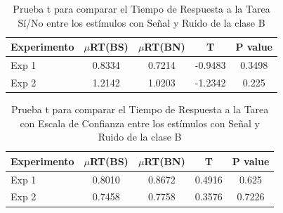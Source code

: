 \begin{table}
\caption[Tiempo de Respuesta a la tarea Sí/No para la clase A (Señal vs Ruido)]{Prueba t para comparar el Tiempo de Respuesta a la Tarea Sí/No entre los estímulos con Señal y Ruido de la clase B}
\label{Tabla_RT1_B}
\centering
\begin{tabular}{l |  c c c c}
\toprule
\textbf{Experimento} & \textbf{$\mu$RT(BS)} & \textbf{$\mu$RT(BN)} & \textbf{T} & \textbf{P value}\\
\midrule
Exp 1 & 0.8334 & 0.7214 & -0.9483 & 0.3498 \\
Exp 2 & 1.2142 & 1.0203 & -1.2342 & 0.225  \\
\bottomrule
\end{tabular}
\end{table}

\begin{table}
\caption[Tiempo de Respuesta a la tarea Sí/No para la clase A (Señal vs Ruido)]{Prueba t para comparar el Tiempo de Respuesta a la Tarea con Escala de Confianza entre los estímulos con Señal y Ruido de la clase B}
\label{Tabla_RT2_B}
\centering
\begin{tabular}{l |  c c c c}
\toprule
\textbf{Experimento} & \textbf{$\mu$RT(BS)} & \textbf{$\mu$RT(BN)} & \textbf{T} & \textbf{P value}\\
\midrule
Exp 1 & 0.8010 & 0.8672 & 0.4916 & 0.625 \\
Exp 2 & 0.7458 & 0.7758 & 0.3576 & 0.7226  \\
\bottomrule
\end{tabular}
\end{table}
